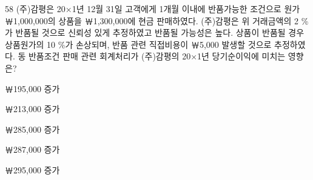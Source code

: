 \begin{question}{58}
(주)감평은 20×1년 12월 31일 고객에게 1개월 이내에 반품가능한 조건으로 원가 ￦1,000,000의 상품을 ￦1,300,000에 현금 판매하였다. (주)감평은 위 거래금액의 2 \%가 반품될 것으로 신뢰성 있게 추정하였고 반품될 가능성은 높다. 상품이 반품될 경우 상품원가의 10 \%가 손상되며, 반품 관련 직접비용이 ￦5,000 발생할 것으로 추정하였다. 동 반품조건 판매 관련 회계처리가 (주)감평의 20×1년 당기순이익에 미치는 영향은?
\begin{choices}
  \item ￦195,000 증가
  \item ￦213,000 증가
  \item ￦285,000 증가
  \item ￦287,000 증가
  \item ￦295,000 증가
\end{choices}
\end{question}
